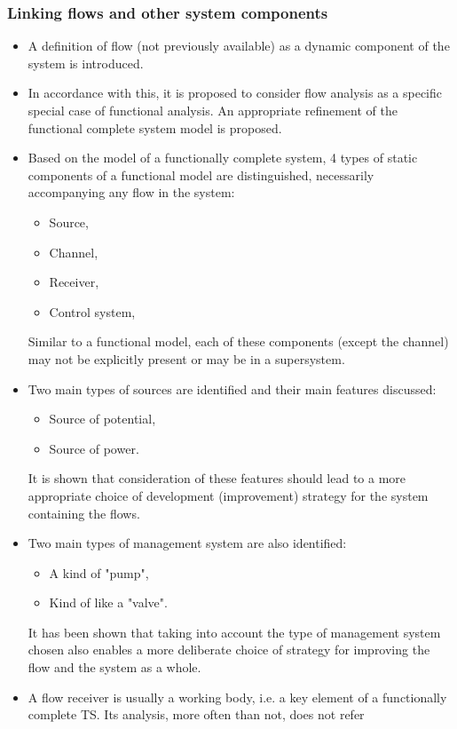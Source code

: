 \documentclass[a4paper,11pt]{article}
\begin{document}
\subsubsection{Linking flows and other system components}
\begin{itemize}
\item A definition of flow (not previously available) as a dynamic component
  of the system is introduced.
\item In accordance with this, it is proposed to consider flow analysis as a
  specific special case of functional analysis. An appropriate refinement of
  the functional complete system model is proposed.
\item Based on the model of a functionally complete system, 4 types of static
  components of a functional model are distinguished, necessarily accompanying
  any flow in the system:
  \begin{itemize}
  \item Source,
  \item Channel,
  \item Receiver,
  \item Control system,
  \end{itemize}
  Similar to a functional model, each of these components (except the channel)
  may not be explicitly present or may be in a supersystem.
\item Two main types of sources are identified and their main features
  discussed:
  \begin{itemize}
  \item Source of potential,
  \item Source of power.
  \end{itemize}
  It is shown that consideration of these features should lead to a more
  appropriate choice of development (improvement) strategy for the system
  containing the flows.
\item Two main types of management system are also identified:
  \begin{itemize}
  \item A kind of "pump",
  \item Kind of like a "valve".
  \end{itemize}
  It has been shown that taking into account the type of management system
  chosen also enables a more deliberate choice of strategy for improving the
  flow and the system as a whole.
\item A flow receiver is usually a working body, i.e. a key element of a
  functionally complete TS. Its analysis, more often than not, does not refer

\end{itemize}
\end{document}
